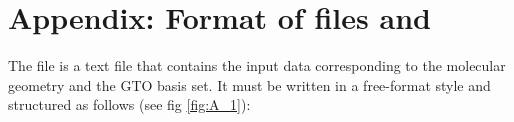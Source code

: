 \documentclass[10pt]{article}
\begin{document}

\newpage

\appendix

\section{Appendix: Format of files \ggbs{ } and \den
\label{A1}}

The \ggbs{ } file is a text file that contains the 
input data corresponding to the molecular geometry and the GTO basis set. 
It must be written in a free-format style and structured as follows 
(see fig \ref{fig:A_1}):
\end{document}
